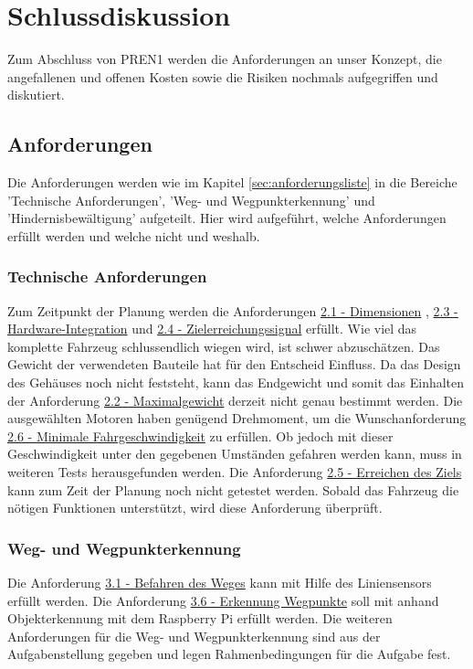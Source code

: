 \documentclass[../main.tex]{subfiles}
\begin{document}
\newpage
\section{Schlussdiskussion}

Zum Abschluss von PREN1 werden die Anforderungen an unser Konzept, die angefallenen und offenen Kosten sowie die Risiken nochmals aufgegriffen und diskutiert.
\subsection{Anforderungen}
Die Anforderungen werden wie im Kapitel \ref{sec:anforderungsliste} in die Bereiche 'Technische Anforderungen', 'Weg- und Wegpunkterkennung' und 'Hindernisbewältigung' aufgeteilt. Hier wird aufgeführt, welche Anforderungen erfüllt werden und welche nicht und weshalb.

\subsubsection{Technische Anforderungen}
Zum Zeitpunkt der Planung werden die Anforderungen \hyperlink{A2.1}{2.1 - Dimensionen} , \hyperlink{A2.3}{2.3 - Hardware-Integration} und \hyperlink{A2.4}{2.4 - Zielerreichungssignal} erfüllt. Wie viel das komplette Fahrzeug schlussendlich wiegen wird, ist schwer abzuschätzen. Das Gewicht der verwendeten Bauteile hat für den Entscheid Einfluss. Da das Design des Gehäuses noch nicht feststeht, kann das Endgewicht und somit das Einhalten der Anforderung \hyperlink{A2.2}{2.2 - Maximalgewicht} derzeit nicht genau bestimmt werden. Die ausgewählten Motoren haben genügend Drehmoment, um die Wunschanforderung \hyperlink{A2.6}{2.6 - Minimale Fahrgeschwindigkeit} zu erfüllen. Ob jedoch mit dieser Geschwindigkeit unter den gegebenen Umständen gefahren werden kann, muss in weiteren Tests herausgefunden werden.
Die Anforderung \hyperlink{A2.5}{2.5 - Erreichen des Ziels} kann zum Zeit der Planung noch nicht getestet werden. Sobald das Fahrzeug die nötigen Funktionen unterstützt, wird diese Anforderung überprüft.

\subsubsection{Weg- und Wegpunkterkennung}
Die Anforderung \hyperlink{A3.1}{3.1 - Befahren des Weges} kann mit Hilfe des Liniensensors erfüllt werden. Die Anforderung \hyperlink{A3.6}{3.6 - Erkennung Wegpunkte} soll mit anhand Objekterkennung mit dem Raspberry Pi erfüllt werden. Die weiteren Anforderungen für die Weg- und Wegpunkterkennung sind aus der Aufgabenstellung gegeben und legen Rahmenbedingungen für die Aufgabe fest.
\end{document}
